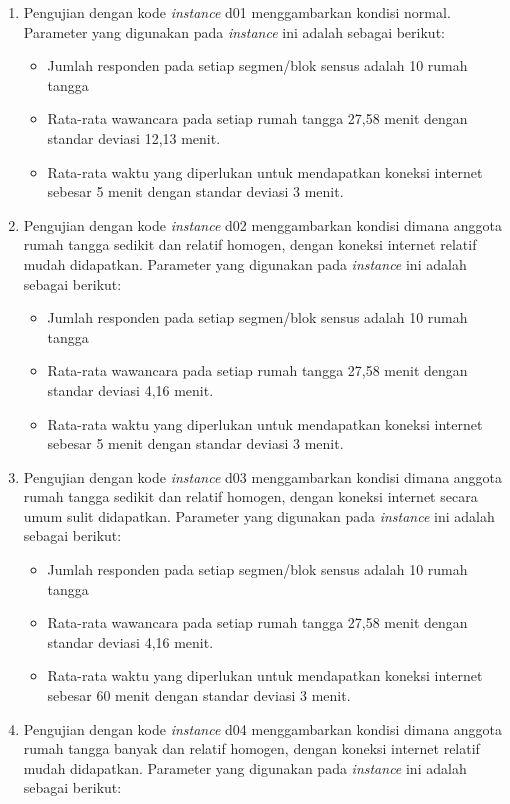 \begin{enumerate}
	\item Pengujian dengan kode \textit{instance} d01 menggambarkan kondisi normal. Parameter yang digunakan pada \textit{instance} ini adalah sebagai berikut:
	\begin{itemize}
		\item Jumlah responden pada setiap segmen/blok sensus adalah 10 rumah tangga
		\item Rata-rata wawancara pada setiap rumah tangga 27,58 menit dengan standar deviasi 12,13 menit.
		\item Rata-rata waktu yang diperlukan untuk mendapatkan koneksi internet sebesar 5 menit dengan standar deviasi 3 menit.
	\end{itemize}
	\item Pengujian dengan kode \textit{instance} d02 menggambarkan kondisi dimana anggota rumah tangga sedikit dan relatif homogen, dengan koneksi internet relatif mudah didapatkan. Parameter yang digunakan pada \textit{instance} ini adalah sebagai berikut:
	\begin{itemize}
		\item Jumlah responden pada setiap segmen/blok sensus adalah 10 rumah tangga
		\item Rata-rata wawancara pada setiap rumah tangga 27,58 menit dengan standar deviasi 4,16 menit.
		\item Rata-rata waktu yang diperlukan untuk mendapatkan koneksi internet sebesar 5 menit dengan standar deviasi 3 menit.
	\end{itemize}
	\item Pengujian dengan kode \textit{instance} d03 menggambarkan kondisi dimana anggota rumah tangga sedikit dan relatif homogen, dengan koneksi internet secara umum sulit didapatkan. Parameter yang digunakan pada \textit{instance} ini adalah sebagai berikut:
	\begin{itemize}
		\item Jumlah responden pada setiap segmen/blok sensus adalah 10 rumah tangga
		\item Rata-rata wawancara pada setiap rumah tangga 27,58 menit dengan standar deviasi 4,16 menit.
		\item Rata-rata waktu yang diperlukan untuk mendapatkan koneksi internet sebesar 60 menit dengan standar deviasi 3 menit.
	\end{itemize}
	\item Pengujian dengan kode \textit{instance} d04 menggambarkan kondisi dimana anggota rumah tangga banyak dan relatif homogen, dengan koneksi internet relatif mudah didapatkan. Parameter yang digunakan pada \textit{instance} ini adalah sebagai berikut:

\end{enumerate}
